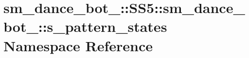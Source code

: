 \hypertarget{namespacesm__dance__bot__3_1_1SS5_1_1sm__dance__bot__3_1_1s__pattern__states}{}\section{sm\+\_\+dance\+\_\+bot\+\_\+:\+:S\+S5\+:\+:sm\+\_\+dance\+\_\+bot\+\_\+:\+:s\+\_\+pattern\+\_\+states Namespace Reference}
\label{namespacesm__dance__bot__3_1_1SS5_1_1sm__dance__bot__3_1_1s__pattern__states}
